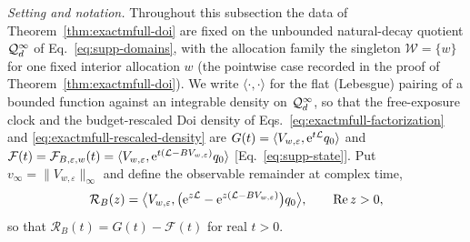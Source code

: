 \emph{Setting and notation.}
Throughout this subsection the data of Theorem~\ref{thm:exactmfull-doi} are
fixed on the unbounded natural-decay quotient \(\mathcal Q_d^{\infty}\) of
Eq.~\eqref{eq:supp-domains}, with the allocation family the singleton
\(\mathcal W=\{w\}\) for one fixed interior allocation \(w\) (the pointwise
case recorded in the proof of Theorem~\ref{thm:exactmfull-doi}).  We write
\(\langle\cdot,\cdot\rangle\) for the flat (Lebesgue) pairing of a bounded
function against an integrable density on \(\mathcal Q_d^{\infty}\), so that the
free-exposure clock and the budget-rescaled Doi density of
Eqs.~\eqref{eq:exactmfull-factorization} and
\eqref{eq:exactmfull-rescaled-density} are
\(G(t)=\langle V_{w,\varepsilon},\mathrm e^{t\mathcal L}q_0\rangle\) and
\(\mathcal F(t)=\mathcal F_{B,\varepsilon,w}(t)
=\langle V_{w,\varepsilon},\mathrm e^{t(\mathcal L-BV_{w,\varepsilon})}q_0\rangle\)
[Eq.~\eqref{eq:supp-state}].  Put
\(v_\infty=\|V_{w,\varepsilon}\|_\infty\) and define the observable
remainder at complex time,
\begin{equation}
 \mathcal R_B(z)
 =\bigl\langle V_{w,\varepsilon},
 \bigl(\mathrm e^{z\mathcal L}-\mathrm e^{z(\mathcal L-BV_{w,\varepsilon})}\bigr)q_0
 \bigr\rangle,
 \qquad \operatorname{Re}z>0,
 \label{eq:exactmfull-b0-remainder}
\end{equation}
so that \(\mathcal R_B(t)=G(t)-\mathcal F(t)\) for real \(t>0\).

